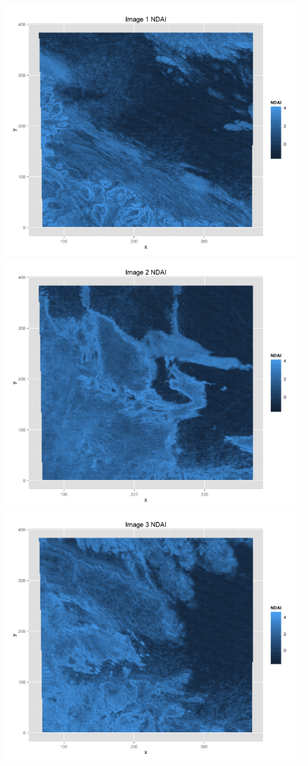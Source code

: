 \documentclass{article}\usepackage[]{graphicx}\usepackage[]{color}
\begin{document}
\begin{figure}
\includegraphics[scale = .35]{Image1NDAI.png}
\includegraphics[scale = .35]{Image2NDAI.png}
\includegraphics[scale = .35]{Image3NDAI.png}

\end{figure}
\end{document}
